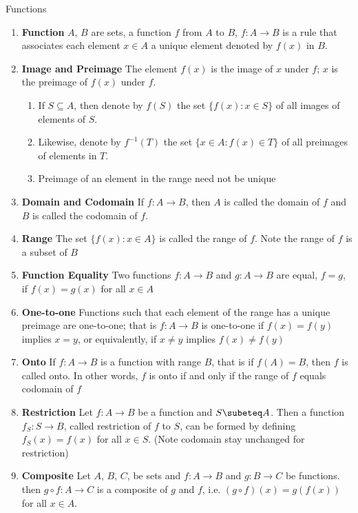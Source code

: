\documentclass[11pt]{article}
\begin{document}
\begin{defn*}
    Functions 
    \begin{enumerate}
        \item \textbf{Function} $A$, $B$ are sets, a function $f$ from $A$ to $B$, $f: A\to B$ is a rule that associates each element $x\in A$ a unique element denoted by $f(x)$ in $B$. 
        \item \textbf{Image and Preimage} The element $f(x)$ is the image of $x$ under $f$; $x$ is the preimage of $f(x)$ under $f$. 
        \begin{enumerate}
            \item If $S\subseteq A$, then denote by $f(S)$ the set $\{ f(x): x \in S\}$ of all images of elements of $S$. \item Likewise, denote by $f^{-1}(T)$ the set $\{x\in A: f(x)\in T \}$ of all preimages of elements in $T$. 
            \item Preimage of an element in the range need not be unique
        \end{enumerate}
        \item \textbf{Domain and Codomain} If $f: A\to B$, then $A$ is called the domain of $f$ and $B$ is called the codomain of $f$. 
        \item \textbf{Range} The set $\{ f(x): x\in A\}$ is called the range of $f$. Note the range of $f$ is a subset of $B$
        \item \textbf{Function Equality} Two functions $f:A\to B$ and $g: A\to B$ are equal, $f=g$, if $f(x) = g(x)$ for all $x\in A$
        \item \textbf{One-to-one} Functions such that each element of the range has a unique preimage are one-to-one; that is $f:A\to B$ is one-to-one if $f(x) = f(y)$ implies $x=y$, or equivalently, if $x\neq y$ implies $f(x)\neq f(y)$
        \item \textbf{Onto} If $f: A\to B$ is a function with range $B$, that is if $f(A) = B$, then $f$ is called onto. In other words, $f$ is onto if and only if the range of $f$ equals codomain of $f$
        \item \textbf{Restriction} Let $f:A\to B$ be a function and $S\subeteq A$. Then a function $f_S: S\to B$, called restriction of $f$ to $S$, can be formed by defining $f_S(x) = f(x)$ for all $x\in S$. (Note codomain stay unchanged for restriction)
        \item \textbf{Composite} Let $A$, $B$, $C$, be sets and $f:A\to B$ and $g: B\to C$ be functions. then $g\circ f: A\to C$ is a composite of $g$ and $f$, i.e. $(g\circ f)(x) = g(f(x))$ for all $x\in A$. 

\end{enumerate}
\end{defn*}
\end{document}

